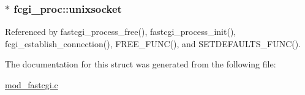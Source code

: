 \hypertarget{structfcgi__proc_acd5a01b1989d829f113d420b63e6cf7c}{
\subsubsection[{unixsocket}]{$\ast$ fcgi\-\_\-proc\-::unixsocket}}\label{structfcgi__proc_acd5a01b1989d829f113d420b63e6cf7c}


Referenced by fastcgi\-\_\-process\-\_\-free(), fastcgi\-\_\-process\-\_\-init(), fcgi\-\_\-establish\-\_\-connection(), F\-R\-E\-E\-\_\-\-F\-U\-N\-C(), and S\-E\-T\-D\-E\-F\-A\-U\-L\-T\-S\-\_\-\-F\-U\-N\-C().



The documentation for this struct was generated from the following file\-:\begin{DoxyCompactItemize}
\item 
\hyperlink{mod__fastcgi_8c}{mod\-\_\-fastcgi.\-c}\end{DoxyCompactItemize}
